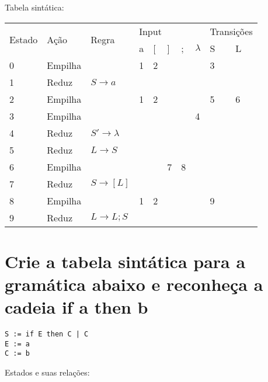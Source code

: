 \documentclass{article}
\begin{document}
Tabela sintática: 

\begin{table}[h]
\begin{tabular}{|l|l|l|l|l|l|l|l|l|l|}
\hline
\multirow{2}{*}{Estado} & \multirow{2}{*}{Ação} & \multirow{2}{*}{Regra} & \multicolumn{5}{l|}{Input} & \multicolumn{2}{l|}{Transições} \\ \cline{4-10} 
 &  &  & a & {[} & {]} & ; & $\lambda$ & S & L \\ \hline
0 & Empilha &  & 1 & 2 &  &  &  & 3 &  \\ \hline
1 & Reduz & $ S \rightarrow a $ &  &  &  &  &  &  &  \\ \hline
2 & Empilha &  & 1 & 2 &  &  &  & 5 & 6 \\ \hline
3 & Empilha &  &  &  &  &  & 4 &  &  \\ \hline
4 & Reduz & $ S' \rightarrow  \lambda $ &  &  &  &  &  &  &  \\ \hline
5 & Reduz & $ L \rightarrow S $ &  &  &  &  &  &  &  \\ \hline
6 & Empilha &  &  &  & 7 & 8 &  &  &  \\ \hline
7 & Reduz & $ S \rightarrow [ L ] $ &  &  &  &  &  &  &  \\ \hline
8 & Empilha &  & 1 & 2 &  &  &  & 9 &  \\ \hline
9 & Reduz & $ L \rightarrow L ; S $ &  &  &  &  &  &  &  \\ \hline
\end{tabular}
\end{table}


\newpage

\section{Crie a tabela sintática para a gramática abaixo e reconheça a cadeia if a then b}

\begin{lstlisting}
S := if E then C | C
E := a 
C := b
\end{lstlisting}


Estados e suas relações:
\end{document}
